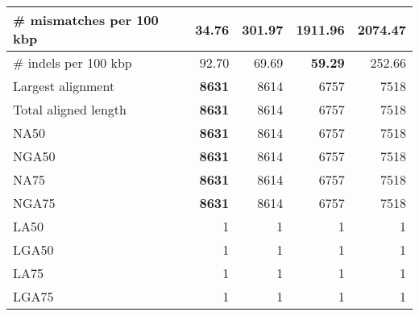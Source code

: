 \documentclass[12pt,a4paper]{article}
\begin{document}
\begin{table}[ht]
\begin{center}
\begin{tabular}{|l*{4}{|r}|}
\# mismatches per 100 kbp & {\bf 34.76} & 301.97 & 1911.96 & 2074.47 \\ \hline
\# indels per 100 kbp & 92.70 & 69.69 & {\bf 59.29} & 252.66 \\ \hline
Largest alignment & {\bf 8631} & 8614 & 6757 & 7518 \\ \hline
Total aligned length & {\bf 8631} & 8614 & 6757 & 7518 \\ \hline
NA50 & {\bf 8631} & 8614 & 6757 & 7518 \\ \hline
NGA50 & {\bf 8631} & 8614 & 6757 & 7518 \\ \hline
NA75 & {\bf 8631} & 8614 & 6757 & 7518 \\ \hline
NGA75 & {\bf 8631} & 8614 & 6757 & 7518 \\ \hline
LA50 & 1 & 1 & 1 & 1 \\ \hline
LGA50 & 1 & 1 & 1 & 1 \\ \hline
LA75 & 1 & 1 & 1 & 1 \\ \hline
LGA75 & 1 & 1 & 1 & 1 \\ \hline
\end{tabular}
\end{center}
\end{table}
\end{document}
